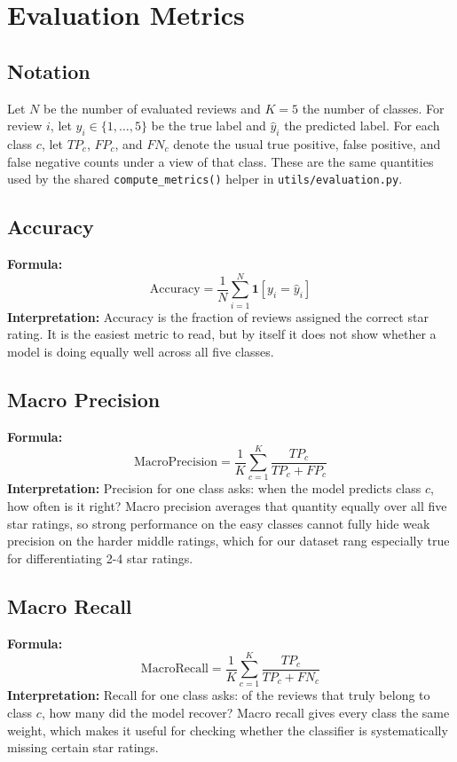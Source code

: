\documentclass[12pt]{article}
\begin{document}
\newpage

\section{Evaluation Metrics}

\subsection{Notation}

Let $N$ be the number of evaluated reviews and $K = 5$ the number of classes. For review $i$, let $y_i \in \{1,\dots,5\}$ be the true label and $\hat{y}_i$ the predicted label. For each class $c$, let $TP_c$, $FP_c$, and $FN_c$ denote the usual true positive, false positive, and false negative counts under a view of that class. These are the same quantities used by the shared \texttt{compute\_metrics()} helper in \texttt{utils/evaluation.py}.


\subsection{Accuracy}
\textbf{Formula:}
\[
    \mathrm{Accuracy} = \frac{1}{N}\sum_{i=1}^{N} \mathbf{1}[y_i = \hat{y}_i]
\]
\textbf{Interpretation:}
Accuracy is the fraction of reviews assigned the correct star rating. It is the easiest metric to read, but by itself it does not show whether a model is doing equally well across all five classes.

\subsection{Macro Precision}
\textbf{Formula:}
\[
    \mathrm{MacroPrecision} = \frac{1}{K}\sum_{c=1}^{K} \frac{TP_c}{TP_c + FP_c}
\]
\textbf{Interpretation:}
Precision for one class asks: when the model predicts class $c$, how often is it right? Macro precision averages that quantity equally over all five star ratings, so strong performance on the easy classes cannot fully hide weak precision on the harder middle ratings, which for our dataset rang especially true for differentiating 2-4 star ratings.

\subsection{Macro Recall}
\textbf{Formula:}
\[
    \mathrm{MacroRecall} = \frac{1}{K}\sum_{c=1}^{K} \frac{TP_c}{TP_c + FN_c}
\]
\textbf{Interpretation:}
Recall for one class asks: of the reviews that truly belong to class $c$, how many did the model recover? Macro recall gives every class the same weight, which makes it useful for checking whether the classifier is systematically missing certain star ratings.
\end{document}

